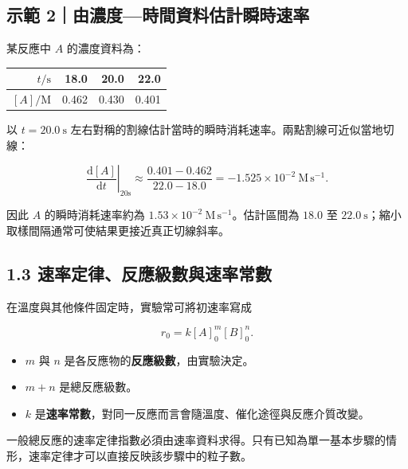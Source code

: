 \documentclass[11pt,a4paper]{article}
\newcounter{none}
\providecommand{\tightlist}{%
  \setlength{\itemsep}{0pt}\setlength{\parskip}{0pt}}
\begin{document}
\begin{HandoutWorkedExample}

\subsection{示範 2｜由濃度---時間資料估計瞬時速率}\label{ux793aux7bc4-2ux7531ux6fc3ux5ea6ux6642ux9593ux8cc7ux6599ux4f30ux8a08ux77acux6642ux901fux7387}

某反應中 \(A\) 的濃度資料為：

{\def\LTcaptype{none} %
\begin{longtable}[]{@{}rrrr@{}}
\toprule\noalign{}
\(t/\mathrm s\) & 18.0 & 20.0 & 22.0 \\
\midrule\noalign{}
\endhead
\bottomrule\noalign{}
\endlastfoot
\([A]/\mathrm M\) & 0.462 & 0.430 & 0.401 \\
\end{longtable}
}

以 \(t=20.0\ \mathrm s\) 左右對稱的割線估計當時的瞬時消耗速率。兩點割線可近似當地切線：

\[
\left.\frac{\mathrm d[A]}{\mathrm dt}\right|_{20\mathrm s}
\approx\frac{0.401-0.462}{22.0-18.0}
=-1.525\times10^{-2}\ \mathrm{M\,s^{-1}}.
\]

因此 \(A\) 的瞬時消耗速率約為 \(1.53\times10^{-2}\ \mathrm{M\,s^{-1}}\)。估計區間為 \(18.0\) 至 \(22.0\ \mathrm s\)；縮小取樣間隔通常可使結果更接近真正切線斜率。

\end{HandoutWorkedExample}

\subsection{1.3 速率定律、反應級數與速率常數}\label{ux901fux7387ux5b9aux5f8bux53cdux61c9ux7d1aux6578ux8207ux901fux7387ux5e38ux6578}

在溫度與其他條件固定時，實驗常可將初速率寫成

\[
r_0=k[A]_0^m[B]_0^n.
\]

\begin{itemize}
\tightlist
\item
  \(m\) 與 \(n\) 是各反應物的\textbf{反應級數}，由實驗決定。
\item
  \(m+n\) 是總反應級數。
\item
  \(k\) 是\textbf{速率常數}，對同一反應而言會隨溫度、催化途徑與反應介質改變。
\end{itemize}

一般總反應的速率定律指數必須由速率資料求得。只有已知為單一基本步驟的情形，速率定律才可以直接反映該步驟中的粒子數。
\end{document}
